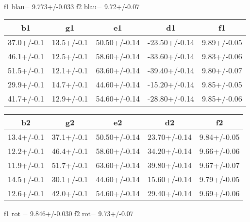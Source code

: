 f1 blau= 9.773+/-0.033
f2 blau= 9.72+/-0.07
\begin{table}
  \centering
\begin{tabular}{ccccc}
  \toprule
b1 & g1 & e1 & d1 & f1 \\
\midrule
37.0+/-0.1 & 13.5+/-0.1 & 50.50+/-0.14 & -23.50+/-0.14 & 9.89+/-0.05 \\
46.1+/-0.1 & 12.5+/-0.1 & 58.60+/-0.14 & -33.60+/-0.14 & 9.83+/-0.06 \\
51.5+/-0.1 & 12.1+/-0.1 & 63.60+/-0.14 & -39.40+/-0.14 & 9.80+/-0.07 \\
29.9+/-0.1 & 14.7+/-0.1 & 44.60+/-0.14 & -15.20+/-0.14 & 9.85+/-0.05 \\
41.7+/-0.1 & 12.9+/-0.1 & 54.60+/-0.14 & -28.80+/-0.14 & 9.85+/-0.06 \\
\bottomrule
\end{tabular}
\end{table}
\begin{table}
  \centering
\begin{tabular}{ccccc}
  \toprule
b2 & g2 & e2 & d2 & f2 \\
\midrule
13.4+/-0.1 & 37.1+/-0.1 & 50.50+/-0.14 & 23.70+/-0.14 & 9.84+/-0.05 \\
12.2+/-0.1 & 46.4+/-0.1 & 58.60+/-0.14 & 34.20+/-0.14 & 9.66+/-0.06 \\
11.9+/-0.1 & 51.7+/-0.1 & 63.60+/-0.14 & 39.80+/-0.14 & 9.67+/-0.07 \\
14.5+/-0.1 & 30.1+/-0.1 & 44.60+/-0.14 & 15.60+/-0.14 & 9.79+/-0.05 \\
12.6+/-0.1 & 42.0+/-0.1 & 54.60+/-0.14 & 29.40+/-0.14 & 9.69+/-0.06 \\
\bottomrule
\end{tabular}
\end{table}

f1 rot = 9.846+/-0.030
f2 rot= 9.73+/-0.07
